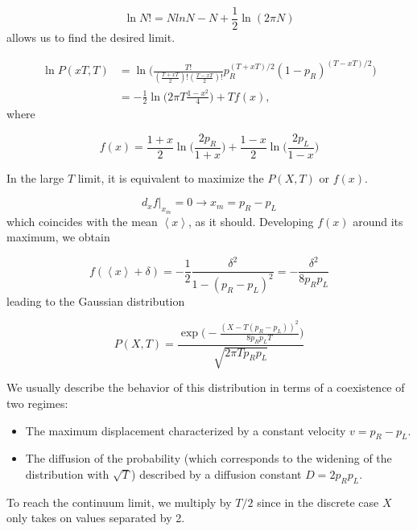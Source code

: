 \documentclass[10pt]{article}
\begin{document}
\begin{equation}
\ln N! = N ln N - N + \frac{1}{2} \ln (2\pi N)
\end{equation}
allows us to find the desired limit.

\begin{equation}
\begin{split}
\ln P (xT, T) &= \ln \bigg( \frac{T!}{ ( \frac{T+xT}{2} )! ( \frac{T - xT}{2} )! } p_R^{(T+xT)/2} (1 - p_R)^{(T-xT)/2} \bigg) \\
&= -\frac{1}{2} \ln \bigg( 2\pi T \frac{1-x^2}{4} \bigg) + T f(x),
\end{split}
\end{equation}
where

\begin{equation}
f(x) = \frac{1+x}{2} \ln \bigg( \frac{2 p_R}{1+x} \bigg) + \frac{1-x}{2} \ln \bigg( \frac{2 p_L}{1-x} \bigg) 
\end{equation}

In the large $T$ limit, it is equivalent to maximize the $P(X,T)$ or $f(x)$.

\begin{equation}
d_x f \rvert_{x_m} = 0 \rightarrow x_m = p_R - p_L
\end{equation}
which coincides with the mean $\left\langle x \right\rangle$, as it should. Developing $f(x)$ around its maximum, we obtain

\begin{equation}
f ( \left\langle x \right \rangle + \delta ) = -\frac{1}{2} \frac{\delta^2}{ 1 - ( p_R - p_L )^2 } = -\frac{\delta^2}{8 p_R p_L}
\end{equation}
leading to the Gaussian distribution

\begin{equation}
P (X, T) = \frac{ \exp \bigg( -\frac{(X - T ( p_R - p_L ))^2}{8p_R p_L T } \bigg)}{\sqrt{2\pi T p_R p_L}}
\end{equation}

We usually describe the behavior of this distribution in terms of a coexistence of two regimes:
\begin{itemize}
\item The maximum displacement characterized by a constant velocity $v = p_R - p_L$.
\item The diffusion of the probability (which corresponds to the widening of the distribution with $\sqrt{T}$) described by a diffusion constant $D = 2 p_R p_L$.
\end{itemize}

To reach the continuum limit, we multiply by $T/2$ since in the discrete case $X$ only takes on values separated by 2.
\end{document}
